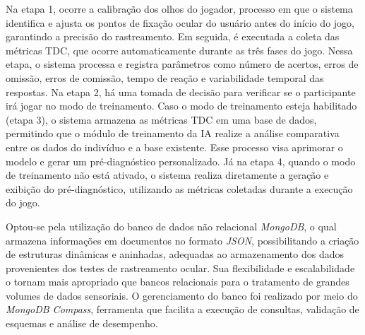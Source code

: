 Na etapa 1, ocorre a calibração dos olhos do jogador, processo em que o sistema identifica e ajusta os pontos de fixação ocular do usuário antes do início do jogo, garantindo a precisão do rastreamento. Em seguida, é executada a coleta das métricas TDC, que ocorre automaticamente durante as três fases do jogo. Nessa etapa, o sistema processa e registra parâmetros como número de acertos, erros de omissão, erros de comissão, tempo de reação e variabilidade temporal das respostas. Na etapa 2, há uma tomada de decisão para verificar se o participante irá jogar no modo de treinamento. Caso o modo de treinamento esteja habilitado (etapa 3), o sistema armazena as métricas TDC em uma base de dados, permitindo que o módulo de treinamento da IA realize a análise comparativa entre os dados do indivíduo e a base existente. Esse processo visa aprimorar o modelo e gerar um pré-diagnóstico personalizado. Já na etapa 4, quando o modo de treinamento não está ativado, o sistema realiza diretamente a geração e exibição do pré-diagnóstico, utilizando as métricas coletadas durante a execução do jogo.

Optou-se pela utilização do banco de dados não relacional \textit{MongoDB}, o qual armazena informações em documentos no formato \textit{JSON}, possibilitando a criação de estruturas dinâmicas e aninhadas, adequadas ao armazenamento dos dados provenientes dos testes de rastreamento ocular. Sua flexibilidade e escalabilidade o tornam mais apropriado que bancos relacionais para o tratamento de grandes volumes de dados sensoriais. O gerenciamento do banco foi realizado por meio do \textit{MongoDB Compass}, ferramenta que facilita a execução de consultas, validação de esquemas e análise de desempenho.
